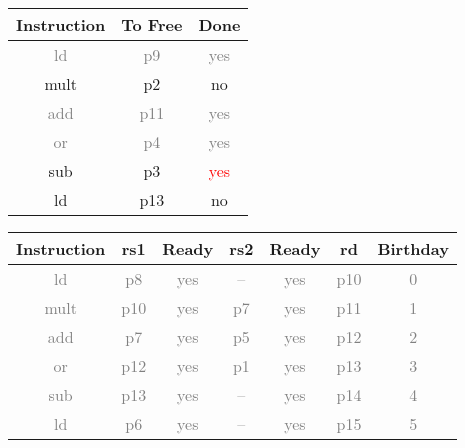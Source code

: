 \documentclass[12pt]{article}
\begin{document}
\begin{enumerate}
\begin{table}[H]
\begin{tabular}{|c|c|c|c|c|c|c|c|c|c|c|c|c|c|c|}
					\hline
				\end{tabular}
			\end{table}
			\begin{table}[H]
				\begin{tabular}{|c|c|c|}
					\hline
					Instruction & To Free & Done\\
					\hline
					\textcolor{gray}{ld} & \textcolor{gray}{p9} & \textcolor{gray}{yes}\\
					\hline
					mult & p2 & no\\
					\hline
					\textcolor{gray}{add} & \textcolor{gray}{p11} & \textcolor{gray}{yes}\\
					\hline
					\textcolor{gray}{or} & \textcolor{gray}{p4} & \textcolor{gray}{yes}\\
					\hline
					sub & p3 & \textcolor{red}{yes}\\
					\hline
					ld & p13 & no\\
					\hline
				\end{tabular}
				\hfill
				\begin{tabular}{|c|c|c|c|c|c|c|}
					\hline
					Instruction & rs1 & Ready & rs2 & Ready & rd & Birthday\\
					\hline
					\textcolor{gray}{ld} & \textcolor{gray}{p8} & \textcolor{gray}{yes} & \textcolor{gray}{--} & \textcolor{gray}{yes} & \textcolor{gray}{p10} & \textcolor{gray}{0}\\
					\hline
					\textcolor{gray}{mult} & \textcolor{gray}{p10} & \textcolor{gray}{yes} & \textcolor{gray}{p7} & \textcolor{gray}{yes} & \textcolor{gray}{p11} & \textcolor{gray}{1}\\
					\hline
					\textcolor{gray}{add} & \textcolor{gray}{p7} & \textcolor{gray}{yes} & \textcolor{gray}{p5} & \textcolor{gray}{yes} & \textcolor{gray}{p12} & \textcolor{gray}{2}\\
					\hline
					\textcolor{gray}{or} & \textcolor{gray}{p12} & \textcolor{gray}{yes} & \textcolor{gray}{p1} & \textcolor{gray}{yes} & \textcolor{gray}{p13} & \textcolor{gray}{3}\\
					\hline
					\textcolor{gray}{sub} & \textcolor{gray}{p13} & \textcolor{gray}{yes} & \textcolor{gray}{--} & \textcolor{gray}{yes} & \textcolor{gray}{p14} & \textcolor{gray}{4}\\
					\hline
					\textcolor{gray}{ld} & \textcolor{gray}{p6} & \textcolor{gray}{yes} & \textcolor{gray}{--} & \textcolor{gray}{yes} & \textcolor{gray}{p15} & \textcolor{gray}{5}\\
					\hline
				\end{tabular}

\end{table}
\end{enumerate}
\end{document}
